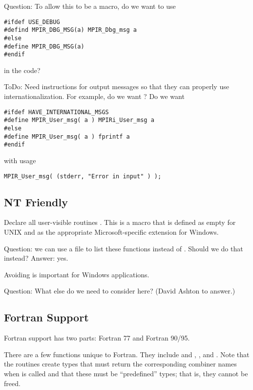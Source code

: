 \documentclass{article}
\begin{document}
Question:  To allow this to be a macro, do we want to use
\begin{verbatim}
#ifdef USE_DEBUG
#defind MPIR_DBG_MSG(a) MPIR_Dbg_msg a
#else
#define MPIR_DBG_MSG(a)
#endif
\end{verbatim}
in the code?

ToDo:
Need instructions for output messages so that they can properly use
internationalization.  For example, do we want
?
Do we want
\begin{verbatim}
#ifdef HAVE_INTERNATIONAL_MSGS
#define MPIR_User_msg( a ) MPIRi_User_msg a
#else
#define MPIR_User_msg( a ) fprintf a
#endif
\end{verbatim}
with usage
\begin{verbatim}
MPIR_User_msg( (stderr, "Error in input" ) );
\end{verbatim}


\subsection{NT Friendly}

Declare all user-visible routines .
This is a 
macro that is defined as empty for UNIX and as the appropriate
Microsoft-specific extension for Windows.

Question: we can use a file to list these functions instead of
.  Should we do that instead?  Answer: yes.

Avoiding  is important for Windows applications.

Question: What else do we need to consider here? (David Ashton to answer.)

\subsection{Fortran Support}
\label{sec:fortran}
Fortran support has two parts: Fortran 77 and Fortran 90/95.  

There are a few functions unique to Fortran.  They include
 and , 
, and 
.  Note that the 
routines create types that must return the corresponding combiner names when
 is called and that these must be
``predefined'' types; that is, they cannot be freed.
\end{document}
